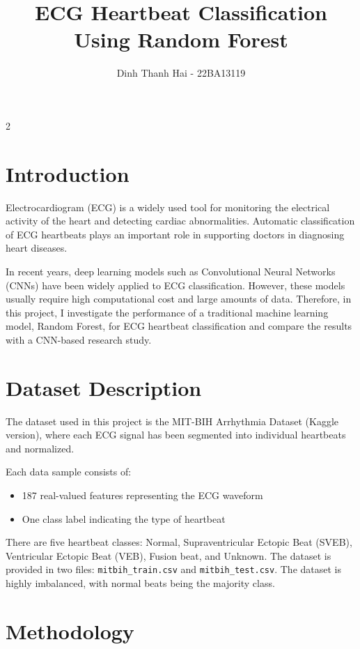 \documentclass[a4paper,10pt]{article}
\title{ECG Heartbeat Classification Using Random Forest}
\author{Dinh Thanh Hai - 22BA13119}
\date{}
\begin{document}
\maketitle

\begin{multicols}{2}

\section{Introduction}

Electrocardiogram (ECG) is a widely used tool for monitoring the electrical activity of the heart and detecting cardiac abnormalities. Automatic classification of ECG heartbeats plays an important role in supporting doctors in diagnosing heart diseases.

In recent years, deep learning models such as Convolutional Neural Networks (CNNs) have been widely applied to ECG classification. However, these models usually require high computational cost and large amounts of data. Therefore, in this project, I investigate the performance of a traditional machine learning model, Random Forest, for ECG heartbeat classification and compare the results with a CNN-based research study.

\section{Dataset Description}

The dataset used in this project is the MIT-BIH Arrhythmia Dataset (Kaggle version), where each ECG signal has been segmented into individual heartbeats and normalized.

Each data sample consists of:
\begin{itemize}
    \item 187 real-valued features representing the ECG waveform
    \item One class label indicating the type of heartbeat
\end{itemize}

There are five heartbeat classes: Normal, Supraventricular Ectopic Beat (SVEB), Ventricular Ectopic Beat (VEB), Fusion beat, and Unknown.  
The dataset is provided in two files: \texttt{mitbih\_train.csv} and \texttt{mitbih\_test.csv}.  
The dataset is highly imbalanced, with normal beats being the majority class.

\section{Methodology}


\end{multicols}
\end{document}
